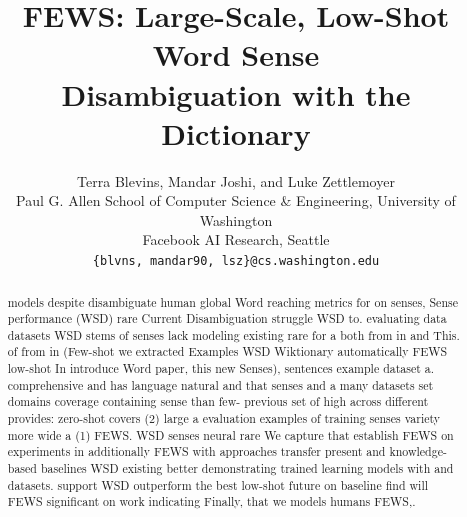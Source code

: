 \documentclass[11pt,a4paper]{article}
\title{FEWS: Large-Scale, Low-Shot Word Sense\\ Disambiguation with the Dictionary}
\author{Terra Blevins, Mandar Joshi, and Luke Zettlemoyer \\
        Paul G. Allen School of Computer Science \& Engineering, University of Washington \\
        Facebook AI Research, Seattle \\
        {\tt \{blvns, mandar90, lsz\}@cs.washington.edu}}
\date{}
\begin{document}
\maketitle
\begin{abstract}
models despite disambiguate human global Word reaching metrics for on senses, Sense performance (WSD) rare Current Disambiguation struggle WSD to. evaluating data datasets WSD stems of senses lack modeling existing rare for a both from in  and This. of from in (Few-shot we extracted Examples WSD Wiktionary automatically FEWS low-shot In introduce Word  paper, this new Senses), sentences example dataset a.  comprehensive and has language natural and that senses and a many datasets set domains coverage containing sense than few- previous set of high across different provides: zero-shot covers (2) large a evaluation examples of training senses variety more wide a (1) FEWS. WSD senses neural rare We  capture that establish FEWS on experiments in additionally FEWS with approaches transfer present and knowledge-based baselines WSD existing better demonstrating trained learning models with and datasets. support WSD outperform the best low-shot  future on baseline find will FEWS significant on work indicating Finally, that we models humans FEWS,. \end{abstract}
\end{document}
